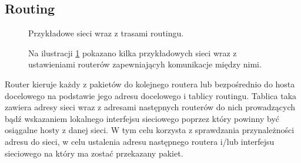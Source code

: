 % 
% 
% 
% 

\subsection{Routing}

\begin{figure}[h!]
\begin{adjustbox}{scale=.73}\end{adjustbox}
\caption{Przykładowe sieci wraz z trasami routingu.}\label{routing_ilustracja}
\end{figure}

\begin{figure}[h!]
\begin{ProTip}{}
Na ilustracji \ref{routing_ilustracja} pokazano kilka przykładowych sieci wraz z ustawieniami routerów zapewniającyh komunikacje między nimi.
\end{ProTip}
\end{figure}

Router kieruje każdy z pakietów do kolejnego routera lub bezpośrednio do hosta docelowego na podstawie jego adresu docelowego i tablicy routingu. Tablica taka zawiera adresy sieci wraz z adresami następnych routerów do nich prowadzących bądź wskazaniem lokalnego interfejsu sieciowego poprzez który powinny być osiągalne hosty z danej sieci. W tym celu korzysta z sprawdzania przynależności adresu do sieci, w celu ustalenia adresu następnego routera i/lub interfejsu sieciowego na który ma zostać przekazany pakiet.

